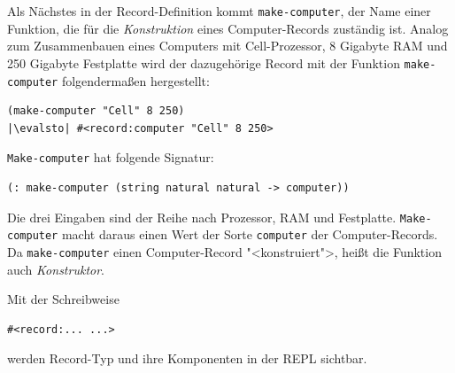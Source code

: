 Als Nächstes in der Record-Definition kommt \lstinline{make-computer},
der Name einer Funktion, die für die \textit{Konstruktion} eines
Computer-Records zuständig ist.  Analog zum Zusammenbauen eines
Computers mit Cell-Prozessor, 8 Gigabyte RAM und 250 Gigabyte
Festplatte wird der dazugehörige Record mit der Funktion
\lstinline{make-computer} folgendermaßen hergestellt:
%
\begin{lstlisting}
(make-computer "Cell" 8 250)
|\evalsto| #<record:computer "Cell" 8 250>
\end{lstlisting}
%
\lstinline{Make-computer} hat folgende Signatur:
%
\begin{lstlisting}
(: make-computer (string natural natural -> computer))
\end{lstlisting}
%
Die drei Eingaben sind der Reihe nach Prozessor, RAM und Festplatte.
\lstinline{Make-computer} macht daraus einen Wert der Sorte
\lstinline{computer} der Computer-Records.  Da \lstinline{make-computer}
einen Computer-Record "<konstruiert">, heißt die Funktion auch
\textit{Konstruktor}.

Mit der Schreibweise
%
\begin{lstlisting}
#<record:... ...>
\end{lstlisting}
%
werden Record-Typ und ihre Komponenten in der REPL sichtbar.


